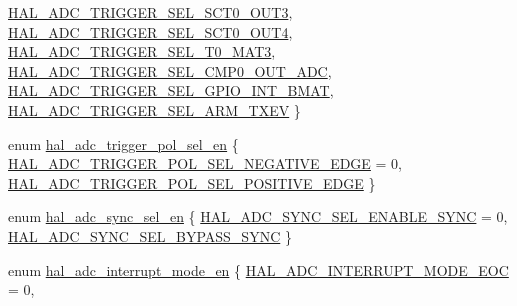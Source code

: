 \begin{DoxyCompactItemize}
\hyperlink{group__ADC_gga67fe859b54301579f1b1daef874514caaca0d6e9551dede7c8a6d596930051e1b}{H\+A\+L\+\_\+\+A\+D\+C\+\_\+\+T\+R\+I\+G\+G\+E\+R\+\_\+\+S\+E\+L\+\_\+\+S\+C\+T0\+\_\+\+O\+U\+T3}, 
\newline
\hyperlink{group__ADC_gga67fe859b54301579f1b1daef874514caabd9e6d4d09caa99ca09a5f44e7797559}{H\+A\+L\+\_\+\+A\+D\+C\+\_\+\+T\+R\+I\+G\+G\+E\+R\+\_\+\+S\+E\+L\+\_\+\+S\+C\+T0\+\_\+\+O\+U\+T4}, 
\hyperlink{group__ADC_gga67fe859b54301579f1b1daef874514caaec235477986c69173f0ad5923a108e5c}{H\+A\+L\+\_\+\+A\+D\+C\+\_\+\+T\+R\+I\+G\+G\+E\+R\+\_\+\+S\+E\+L\+\_\+\+T0\+\_\+\+M\+A\+T3}, 
\hyperlink{group__ADC_gga67fe859b54301579f1b1daef874514caa2ad01d053980af503848525f78d777cf}{H\+A\+L\+\_\+\+A\+D\+C\+\_\+\+T\+R\+I\+G\+G\+E\+R\+\_\+\+S\+E\+L\+\_\+\+C\+M\+P0\+\_\+\+O\+U\+T\+\_\+\+A\+DC}, 
\hyperlink{group__ADC_gga67fe859b54301579f1b1daef874514caa6a9b003480c13c98d8cc1f80bf9c83d1}{H\+A\+L\+\_\+\+A\+D\+C\+\_\+\+T\+R\+I\+G\+G\+E\+R\+\_\+\+S\+E\+L\+\_\+\+G\+P\+I\+O\+\_\+\+I\+N\+T\+\_\+\+B\+M\+AT}, 
\newline
\hyperlink{group__ADC_gga67fe859b54301579f1b1daef874514caa246bfa95b40201277d6c5220c7b57d55}{H\+A\+L\+\_\+\+A\+D\+C\+\_\+\+T\+R\+I\+G\+G\+E\+R\+\_\+\+S\+E\+L\+\_\+\+A\+R\+M\+\_\+\+T\+X\+EV}
 \}
\item 
enum \hyperlink{group__ADC_ga4c5aa9e0991c432640845d2aedb971b2}{hal\+\_\+adc\+\_\+trigger\+\_\+pol\+\_\+sel\+\_\+en} \{ \hyperlink{group__ADC_gga4c5aa9e0991c432640845d2aedb971b2a007c22a34504d8557d98704becf95dc8}{H\+A\+L\+\_\+\+A\+D\+C\+\_\+\+T\+R\+I\+G\+G\+E\+R\+\_\+\+P\+O\+L\+\_\+\+S\+E\+L\+\_\+\+N\+E\+G\+A\+T\+I\+V\+E\+\_\+\+E\+D\+GE} = 0, 
\hyperlink{group__ADC_gga4c5aa9e0991c432640845d2aedb971b2a90868bfab7ec6bdbbca671834798002a}{H\+A\+L\+\_\+\+A\+D\+C\+\_\+\+T\+R\+I\+G\+G\+E\+R\+\_\+\+P\+O\+L\+\_\+\+S\+E\+L\+\_\+\+P\+O\+S\+I\+T\+I\+V\+E\+\_\+\+E\+D\+GE}
 \}
\item 
enum \hyperlink{group__ADC_ga8aa0efd767a9edc5a80b80c4061e0904}{hal\+\_\+adc\+\_\+sync\+\_\+sel\+\_\+en} \{ \hyperlink{group__ADC_gga8aa0efd767a9edc5a80b80c4061e0904a9b81d3ee891639da0e3cec4be09aa668}{H\+A\+L\+\_\+\+A\+D\+C\+\_\+\+S\+Y\+N\+C\+\_\+\+S\+E\+L\+\_\+\+E\+N\+A\+B\+L\+E\+\_\+\+S\+Y\+NC} = 0, 
\hyperlink{group__ADC_gga8aa0efd767a9edc5a80b80c4061e0904a1cbf7646bbe7c32e3e21663fc5952d77}{H\+A\+L\+\_\+\+A\+D\+C\+\_\+\+S\+Y\+N\+C\+\_\+\+S\+E\+L\+\_\+\+B\+Y\+P\+A\+S\+S\+\_\+\+S\+Y\+NC}
 \}
\item 
enum \hyperlink{group__ADC_gaf4981172881d597ede49249ba04fcafe}{hal\+\_\+adc\+\_\+interrupt\+\_\+mode\+\_\+en} \{ \hyperlink{group__ADC_ggaf4981172881d597ede49249ba04fcafea5ffa6da6af1258df4a582e682fab937e}{H\+A\+L\+\_\+\+A\+D\+C\+\_\+\+I\+N\+T\+E\+R\+R\+U\+P\+T\+\_\+\+M\+O\+D\+E\+\_\+\+E\+OC} = 0, 

\end{DoxyCompactItemize}
